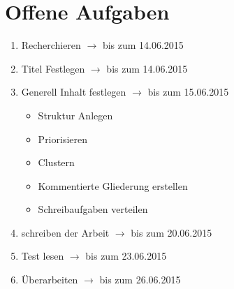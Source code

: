 \documentclass{article}
\begin{document}
\section{Offene Aufgaben}
\begin{enumerate}
    \item Recherchieren $\rightarrow$ bis zum 14.06.2015
    \item Titel Festlegen $\rightarrow$ bis zum 14.06.2015
    \item Generell Inhalt festlegen $\rightarrow$ bis zum 15.06.2015
        \begin{itemize}
            \item Struktur Anlegen
            \item Priorisieren
            \item Clustern
            \item Kommentierte Gliederung erstellen
            \item Schreibaufgaben verteilen
        \end{itemize}
    \item schreiben der Arbeit $\rightarrow$ bis zum 20.06.2015
    \item Test lesen $\rightarrow$ bis zum 23.06.2015
    \item Überarbeiten $\rightarrow$ bis zum 26.06.2015
\end{enumerate}
\end{document}
